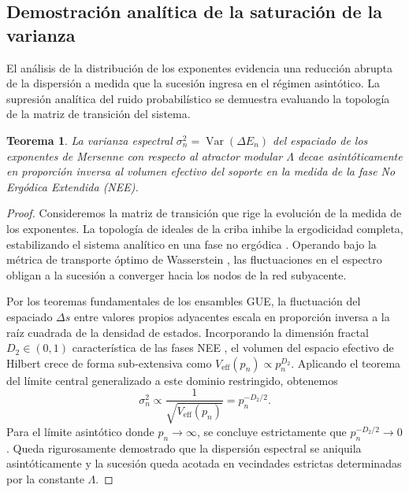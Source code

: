 \documentclass{article}
\numberwithin{equation}{section}
\DeclareMathOperator{\Var}{Var}
\theoremstyle{plain}
\newtheorem{teorema}{Teorema}[section]
\theoremstyle{definition}
\begin{document}
\subsection{Demostración analítica de la saturación de la varianza}

El análisis de la distribución de los exponentes evidencia una reducción abrupta de la dispersión a medida que la sucesión ingresa en el régimen asintótico. La supresión analítica del ruido probabilístico se demuestra evaluando la topología de la matriz de transición del sistema.

\begin{teorema}
\label{teo:saturacion_varianza}
La varianza espectral $\sigma^2_n = \Var(\Delta E_n)$ del espaciado de los exponentes de Mersenne con respecto al atractor modular $\Lambda$ decae asintóticamente en proporción inversa al volumen efectivo del soporte en la medida de la fase No Ergódica Extendida (NEE).
\end{teorema}

\begin{proof}
Consideremos la matriz de transición que rige la evolución de la medida de los exponentes. La topología de ideales de la criba inhibe la ergodicidad completa, estabilizando el sistema analítico en una fase no ergódica \cite{Kravtsov2015}. Operando bajo la métrica de transporte óptimo de Wasserstein \cite{Bourne2021}, las fluctuaciones en el espectro obligan a la sucesión a converger hacia los nodos de la red subyacente.

Por los teoremas fundamentales de los ensambles GUE, la fluctuación del espaciado $\Delta s$ entre valores propios adyacentes escala en proporción inversa a la raíz cuadrada de la densidad de estados. Incorporando la dimensión fractal $D_2 \in (0, 1)$ característica de las fases NEE \cite{Khaymovich2021}, el volumen del espacio efectivo de Hilbert crece de forma sub-extensiva como $V_{\text{eff}}(p_n) \propto p_n^{D_2}$. Aplicando el teorema del límite central generalizado a este dominio restringido, obtenemos
\begin{equation}
    \sigma^2_n \propto \frac{1}{\sqrt{V_{\text{eff}}(p_n)}} = p_n^{-D_2/2}.
\end{equation}
Para el límite asintótico donde $p_n \to \infty$, se concluye estrictamente que $p_n^{-D_2/2} \to 0$. Queda rigurosamente demostrado que la dispersión espectral se aniquila asintóticamente y la sucesión queda acotada en vecindades estrictas determinadas por la constante $\Lambda$.
\end{proof}
\end{document}

